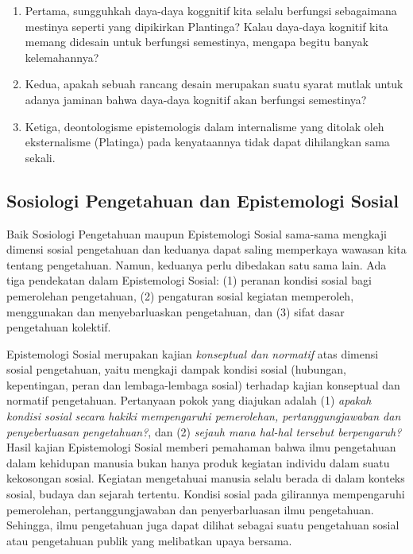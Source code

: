 \documentclass[10pt,a4paper]{article}
\renewenvironment{quote}
{\list{}{%
       \leftmargin 1.5em 
       \rightmargin 0em}
   \item\relax}
{\endlist}
\def\tightlist{}
\begin{document}
\begin{multicols}{2}
\begin{itemize}
  \begin{enumerate}
  \def\labelenumi{\arabic{enumi}.}
  \tightlist
  \item
    Pertama, sungguhkah daya-daya koggnitif kita selalu berfungsi
    sebagaimana mestinya seperti yang dipikirkan Plantinga? Kalau
    daya-daya kognitif kita memang didesain untuk berfungsi semestinya,
    mengapa begitu banyak kelemahannya?
  \item
    Kedua, apakah sebuah rancang desain merupakan suatu syarat mutlak
    untuk adanya jaminan bahwa daya-daya kognitif akan berfungsi
    semestinya?
  \item
    Ketiga, deontologisme epistemologis dalam internalisme yang ditolak
    oleh eksternalisme (Platinga) pada kenyataannya tidak dapat
    dihilangkan sama sekali.
  \end{enumerate}
\end{itemize}

\hypertarget{sosiologi-pengetahuan-dan-epistemologi-sosial}{%
\subsection{Sosiologi Pengetahuan dan Epistemologi
Sosial}\label{sosiologi-pengetahuan-dan-epistemologi-sosial}}

\begin{quote}
Baik Sosiologi Pengetahuan maupun Epistemologi Sosial sama-sama mengkaji
dimensi sosial pengetahuan dan keduanya dapat saling memperkaya wawasan
kita tentang pengetahuan. Namun, keduanya perlu dibedakan satu sama
lain. Ada tiga pendekatan dalam Epistemologi Sosial: (1) peranan kondisi
sosial bagi pemerolehan pengetahuan, (2) pengaturan sosial kegiatan
memperoleh, menggunakan dan menyebarluaskan pengetahuan, dan (3) sifat
dasar pengetahuan kolektif.
\end{quote}

Epistemologi Sosial merupakan kajian \emph{konseptual dan normatif} atas
dimensi sosial pengetahuan, yaitu mengkaji dampak kondisi sosial
(hubungan, kepentingan, peran dan lembaga-lembaga sosial) terhadap
kajian konseptual dan normatif pengetahuan. Pertanyaan pokok yang
diajukan adalah (1) \emph{apakah kondisi sosial secara hakiki
mempengaruhi pemerolehan, pertanggungjawaban dan penyeberluasan
pengetahuan?}, dan (2) \emph{sejauh mana hal-hal tersebut berpengaruh?}
Hasil kajian Epistemologi Sosial memberi pemahaman bahwa ilmu
pengetahuan dalam kehidupan manusia bukan hanya produk kegiatan individu
dalam suatu kekosongan sosial. Kegiatan mengetahuai manusia selalu
berada di dalam konteks sosial, budaya dan sejarah tertentu. Kondisi
sosial pada gilirannya mempengaruhi pemerolehan, pertanggungjawaban dan
penyerbarluasan ilmu pengetahuan. Sehingga, ilmu pengetahuan juga dapat
dilihat sebagai suatu pengetahuan sosial atau pengetahuan publik yang
melibatkan upaya bersama.


\end{multicols}
\end{document}

